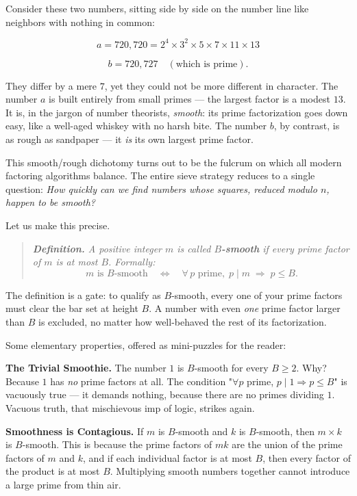 

Consider these two numbers, sitting side by side on the number line like neighbors with nothing in common:

\[a = 720{,}720 = 2^4 \times 3^2 \times 5 \times 7 \times 11 \times 13\]

\[b = 720{,}727 \quad (\text{which is prime}).\]

They differ by a mere $7$, yet they could not be more different in character. The number $a$ is built entirely from small primes --- the largest factor is a modest $13$. It is, in the jargon of number theorists, \textit{smooth}: its prime factorization goes down easy, like a well-aged whiskey with no harsh bite. The number $b$, by contrast, is as rough as sandpaper --- it \textit{is} its own largest prime factor.

This smooth/rough dichotomy turns out to be the fulcrum on which all modern factoring algorithms balance. The entire sieve strategy reduces to a single question: \textit{How quickly can we find numbers whose squares, reduced modulo $n$, happen to be smooth?}

Let us make this precise.


\begin{quote}
\itshape
\textbf{Definition.} A positive integer $m$ is called \textbf{$B$-smooth} if every prime factor of $m$ is at most $B$. Formally: $$m \text{ is } B\text{-smooth} \quad\Longleftrightarrow\quad \forall\, p \text{ prime},\; p \mid m \;\Rightarrow\; p \leq B.$$
\end{quote}


The definition is a gate: to qualify as $B$-smooth, every one of your prime factors must clear the bar set at height $B$. A number with even \textit{one} prime factor larger than $B$ is excluded, no matter how well-behaved the rest of its factorization.

Some elementary properties, offered as mini-puzzles for the reader:

\textbf{The Trivial Smoothie.} The number $1$ is $B$-smooth for every $B \geq 2$. Why? Because $1$ has \textit{no} prime factors at all. The condition "$\forall p$ prime, $p \mid 1 \Rightarrow p \leq B$" is vacuously true --- it demands nothing, because there are no primes dividing $1$. Vacuous truth, that mischievous imp of logic, strikes again.

\textbf{Smoothness is Contagious.} If $m$ is $B$-smooth and $k$ is $B$-smooth, then $m \times k$ is $B$-smooth. This is because the prime factors of $mk$ are the union of the prime factors of $m$ and $k$, and if each individual factor is at most $B$, then every factor of the product is at most $B$. Multiplying smooth numbers together cannot introduce a large prime from thin air.

